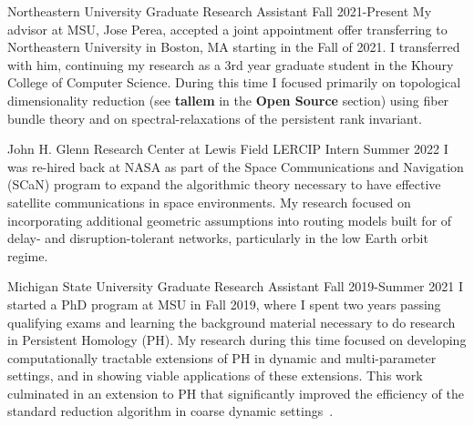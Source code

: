\documentclass[11pt,a4paper,sans]{moderncv} %
\begin{document}
			 {Northeastern University}
			 {Graduate Research Assistant}
			 {Fall 2021-Present}{}{\vspace{3pt}
			 My advisor at MSU, Jose Perea, accepted a joint appointment offer transferring to Northeastern University in Boston, MA starting in the Fall of 2021. I transferred with him, continuing my research as a 3rd year graduate student in the Khoury College of Computer Science. During this time I focused primarily on topological dimensionality reduction (see \textbf{tallem} in the \textbf{Open Source} section) using fiber bundle theory and on spectral-relaxations of the persistent rank invariant.
			}
\vspace{0.75em}

			 {John H. Glenn Research Center at Lewis Field}
			 {LERCIP Intern}
			 {Summer 2022}{}{\vspace{3pt}
I was re-hired back at NASA as part of the Space Communications and Navigation (SCaN) program to expand the algorithmic theory necessary to have effective satellite communications in space environments. My research focused on incorporating additional geometric assumptions into routing models built for of delay- and disruption-tolerant networks, particularly in the low Earth orbit regime.
}
\vspace{0.75em}

			 {Michigan State University}
			 {Graduate Research Assistant}
			 {Fall 2019-Summer 2021}{}{\vspace{3pt}
			 I started a PhD program at MSU in Fall 2019, where I spent two years passing qualifying exams and learning the background material necessary to do research in Persistent Homology (PH).
			 My research during this time focused on developing computationally tractable extensions of PH in dynamic and multi-parameter settings, and in showing viable applications of these extensions. 
			This work culminated in an extension to PH that significantly improved the efficiency of the standard reduction algorithm in coarse dynamic settings~\cite{piekenbrock2021move}.
			 }
\vspace{0.75em}
\end{document}
